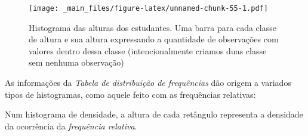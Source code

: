\documentclass[
]{book}
\newenvironment{Shaded}{\begin{snugshade}}{\end{snugshade}}
\newcommand{\AttributeTok}[1]{\textcolor[rgb]{0.77,0.63,0.00}{#1}}
\newcommand{\DecValTok}[1]{\textcolor[rgb]{0.00,0.00,0.81}{#1}}
\newcommand{\FloatTok}[1]{\textcolor[rgb]{0.00,0.00,0.81}{#1}}
\newcommand{\FunctionTok}[1]{\textcolor[rgb]{0.00,0.00,0.00}{#1}}
\newcommand{\NormalTok}[1]{#1}
\newcommand{\OtherTok}[1]{\textcolor[rgb]{0.56,0.35,0.01}{#1}}
\newcommand{\SpecialCharTok}[1]{\textcolor[rgb]{0.00,0.00,0.00}{#1}}
\newcommand{\StringTok}[1]{\textcolor[rgb]{0.31,0.60,0.02}{#1}}
\begin{document}
\begin{Shaded}
\end{Shaded}

\begin{figure}
\centering
\texttt{[image: \_main\_files/figure-latex/unnamed-chunk-55-1.pdf]}
\caption{\label{fig:unnamed-chunk-55}Histograma das alturas dos estudantes. Uma barra para cada classe de altura e sua altura expressando a quantidade de observações com valores dentro dessa classe (intencionalmente criamos duas classe sem nenhuma observação)}
\end{figure}

As informações da \emph{Tabela de distribuição de frequências} dão origem a variados tipos de histogramas, como aquele feito com as frequências relativas:

\hfill\break

Num histograma de densidade, a altura de cada retângulo representa a densidade da ocorrência da \emph{frequência relativa}.
\end{document}
